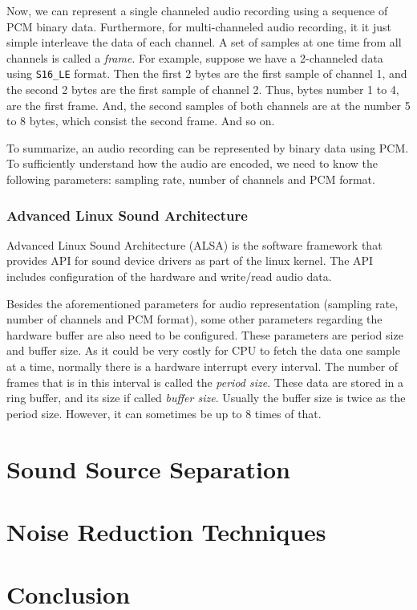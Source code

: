 \documentclass[11pt,a4paper]{report}
\begin{document}
Now, we can represent a single channeled audio recording using a sequence of PCM binary data. Furthermore, for multi-channeled audio recording, it it just simple interleave the data of each channel. A set of samples at one time from all channels is called a \textit{frame}. For example, suppose we have a 2-channeled data using \texttt{S16\_LE} format. Then the first 2 bytes are the first sample of channel 1, and the second 2 bytes are the first sample of channel 2. Thus, bytes number 1 to 4, are the first frame. And, the second samples of both channels are at the number 5 to 8 bytes, which consist the second frame. And so on.

To summarize, an audio recording can be represented by binary data using PCM. To sufficiently understand how the audio are encoded, we need to know the following parameters: sampling rate, number of channels and PCM format.

\subsection{Advanced Linux Sound Architecture}
Advanced Linux Sound Architecture (ALSA) is the software framework that provides API for sound device drivers as part of the linux kernel. The API includes configuration of the hardware and write/read audio data.

Besides the aforementioned parameters for audio representation (sampling rate, number of channels and PCM format), some other parameters regarding the hardware buffer are also need to be configured. These parameters are period size and buffer size. As it could be very costly for CPU to fetch the data one sample at a time, normally there is a hardware interrupt every interval. The number of frames that is in this interval is called the \textit{period size}. These data are stored in a ring buffer, and its size if called \textit{buffer size}. Usually the buffer size is twice as the period size. However, it can sometimes be up to 8 times of that.


\chapter{Sound Source Separation}


\chapter{Noise Reduction Techniques}

\chapter{Conclusion}




 
\end{document}
